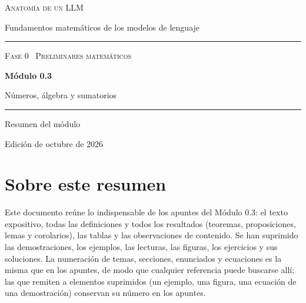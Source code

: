 \documentclass[11pt,a4paper,twoside,openany]{book}
\begin{document}
\frontmatter
\begin{titlepage}
\centering
\vspace*{2.5cm}
{\large\scshape Anatomía de un LLM}\par
\vspace{0.4cm}
{\normalsize Fundamentos matemáticos de los modelos de lenguaje}\par
\vspace{2.2cm}
\rule{\textwidth}{0.8pt}\par\vspace{0.5cm}
{\small\scshape Fase 0 \textperiodcentered\ Preliminares matemáticos}\par\vspace{0.3cm}
{\Huge\bfseries Módulo 0.3\par}\vspace{0.3cm}
{\LARGE Números, álgebra y sumatorios\par}
\vspace{0.5cm}\rule{\textwidth}{0.4pt}\par
\vspace{1.6cm}
{\large Resumen del módulo}\par
\vfill
{\small Edición de octubre de 2026}\par
\end{titlepage}

\chapter*{Sobre este resumen}

Este documento reúne lo indispensable de los apuntes del Módulo 0.3: el texto expositivo, todas las definiciones y todos los resultados (teoremas, proposiciones, lemas y corolarios), las tablas y las observaciones de contenido. Se han suprimido las demostraciones, los ejemplos, las lecturas, las figuras, los ejercicios y sus soluciones. La numeración de temas, secciones, enunciados y ecuaciones es la misma que en los apuntes, de modo que cualquier referencia puede buscarse allí; las que remiten a elementos suprimidos (un ejemplo, una figura, una ecuación de una demostración) conservan su número en los apuntes.
\end{document}
